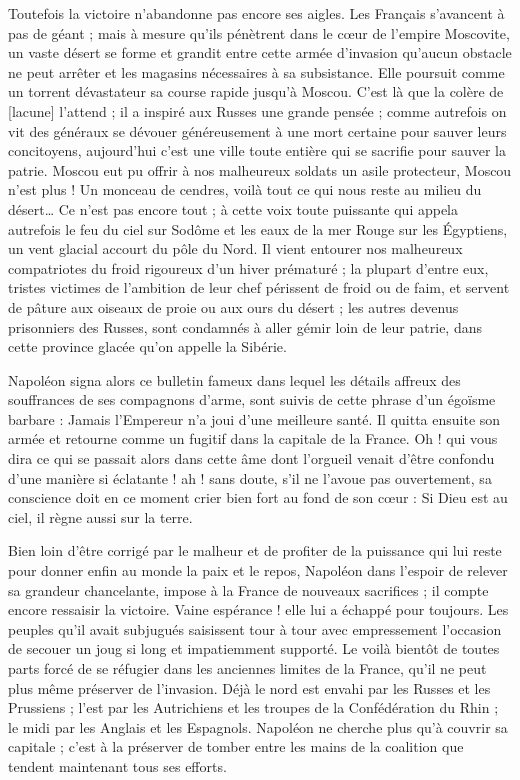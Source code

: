 Toutefois la victoire n'abandonne pas encore ses aigles. Les Français s'avancent à pas de géant ; mais à mesure qu'ils pénètrent dans le cœur de l'empire Moscovite, un vaste désert se forme et grandit entre cette armée d'invasion qu'aucun obstacle ne peut arrêter et les magasins nécessaires à sa subsistance. Elle poursuit comme un torrent dévastateur sa course rapide jusqu'à Moscou. C'est là que la colère de [lacune]
l'attend ; il a inspiré aux Russes une grande pensée ; comme autrefois on vit des généraux se dévouer généreusement à une mort certaine pour sauver leurs concitoyens, aujourd'hui c'est une ville toute entière qui se sacrifie pour sauver la patrie. Moscou eut pu offrir à nos malheureux soldats un asile protecteur, Moscou n'est plus ! Un monceau de cendres, voilà tout ce qui nous reste au milieu du désert… Ce n'est pas encore tout ; à cette voix toute puissante qui appela autrefois le feu du ciel sur Sodôme et les eaux de la mer Rouge sur les Égyptiens, un vent glacial accourt du pôle du Nord. Il vient entourer nos malheureux compatriotes du froid rigoureux d'un hiver prématuré ; la plupart d'entre eux, tristes victimes de l'ambition de leur chef périssent de froid ou de faim, et servent de pâture aux oiseaux de proie ou aux ours du désert ; les autres devenus prisonniers des Russes, sont condamnés à aller gémir loin de leur patrie, dans cette province glacée qu'on appelle la Sibérie.

Napoléon signa alors ce bulletin fameux dans lequel les détails affreux des souffrances de ses compagnons d'arme, sont suivis de cette phrase d'un égoïsme barbare : Jamais l'Empereur n'a joui d'une meilleure santé. Il quitta ensuite son armée et retourne comme un fugitif dans la capitale de la France. Oh ! qui vous dira ce qui se passait alors dans cette âme dont l'orgueil venait d'être confondu d'une manière si éclatante ! ah ! sans doute, s'il ne l'avoue pas ouvertement, sa conscience doit en ce moment crier bien fort au fond de son cœur : Si Dieu est au ciel, il règne aussi sur la terre.

Bien loin d'être corrigé par le malheur et de profiter de la puissance qui lui reste pour donner enfin au monde la paix et le
repos, Napoléon dans l'espoir de relever sa grandeur chancelante, impose à la France de nouveaux sacrifices ; il compte encore ressaisir la victoire. Vaine espérance ! elle lui a échappé pour toujours. Les peuples qu'il avait subjugués saisissent tour à tour avec empressement l'occasion de secouer un joug si long et impatiemment supporté. Le voilà bientôt de toutes parts forcé de se réfugier dans les anciennes limites de la France, qu'il ne peut plus même préserver de l'invasion. Déjà le nord est envahi par les Russes et les Prussiens ; l'est par les Autrichiens et les troupes de la Confédération du Rhin ; le midi par les Anglais et les Espagnols. Napoléon ne cherche plus qu'à couvrir sa capitale ; c'est à la préserver de tomber entre les mains de la coalition que tendent maintenant tous ses efforts.

